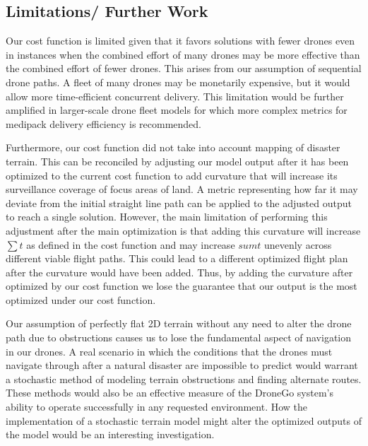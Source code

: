 \documentclass[twocolumn,10pt]{asme2ej}
\begin{document}
\subsection{Limitations/ Further Work}
Our cost function is limited given that it favors solutions with fewer drones even in instances when the combined effort of many drones may be more effective than the combined effort of fewer drones. This arises from our assumption of sequential drone paths. A fleet of many drones may be monetarily expensive, but it would allow more time-efficient concurrent delivery. This limitation would be further amplified in larger-scale drone fleet models for which  more complex metrics for medipack delivery efficiency is recommended.

Furthermore, our cost function did not take into account mapping of disaster terrain. This can be reconciled by adjusting our model output after it has been optimized to the current cost function to add curvature that will increase its surveillance coverage of focus areas of land. A metric representing how far it may deviate from the initial straight line path can be applied to the adjusted output to reach a single solution. However, the main limitation of performing this adjustment after the main optimization is that adding this curvature will increase $\sum{t}$ as defined in the cost function and may increase $sum{t}$ unevenly across different viable flight paths. This could lead to a different optimized flight plan after the curvature would have been added. Thus, by adding the curvature after optimized by our cost function we lose the guarantee that our output is the most optimized under our cost function.

Our assumption of perfectly flat 2D terrain without any need to alter the drone path due to obstructions causes us to lose the fundamental aspect of navigation in our drones. A real scenario in which the conditions that the drones must navigate through after a natural disaster are impossible to predict would warrant a stochastic method of modeling terrain obstructions and finding alternate routes. These methods would also be an effective measure of the DroneGo system's ability to operate successfully in any requested environment. How the implementation of a stochastic terrain model might alter the optimized outputs of the model would be an interesting investigation. 
\end{document}
